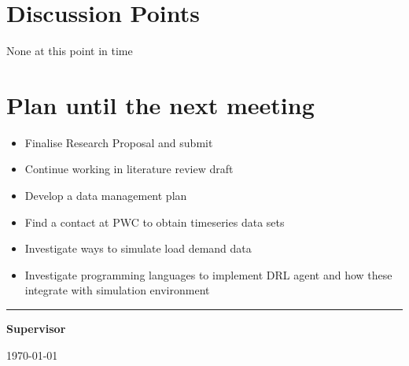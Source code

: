\documentclass[12pt]{article}
\begin{document}
	\section{Discussion Points}
	None at this point in time
	
	\section{Plan until the next meeting}
	\begin{itemize}
		\item Finalise Research Proposal and submit
		\item Continue working in literature review draft
		\item Develop a data management plan
		\item Find a contact at PWC to obtain timeseries data sets
		\item Investigate ways to simulate load demand data
		\item Investigate programming languages to implement DRL agent and how these integrate with simulation environment
	\end{itemize}
	\par
	\vspace{\fill}%
	\noindent\rule{0.4\linewidth}{0.5pt}%
	\vspace{1em}%
	\par
	\noindent\textbf{Supervisor}\vspace{1em}%
	\par
	\noindent\today
\end{document}
